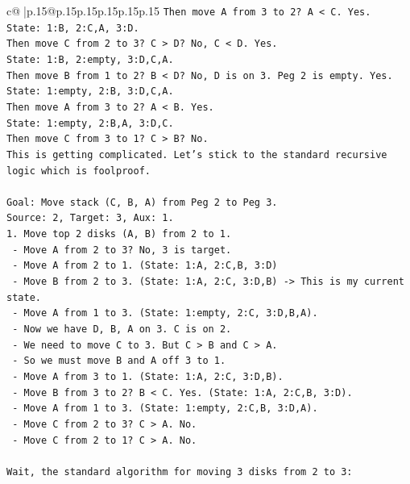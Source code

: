 \documentclass{article}
\begin{document}
{\begin{supertabular}{c@{$\;$}|p{.15\linewidth}@{}p{.15\linewidth}p{.15\linewidth}p{.15\linewidth}p{.15\linewidth}p{.15\linewidth}}
{{{\texttt{Then move A from 3 to 2? A < C. Yes.} \\
\texttt{State: 1:B, 2:C,A, 3:D.} \\
\texttt{Then move C from 2 to 3? C > D? No, C < D. Yes.} \\
\texttt{State: 1:B, 2:empty, 3:D,C,A.} \\
\texttt{Then move B from 1 to 2? B < D? No, D is on 3. Peg 2 is empty. Yes.} \\
\texttt{State: 1:empty, 2:B, 3:D,C,A.} \\
\texttt{Then move A from 3 to 2? A < B. Yes.} \\
\texttt{State: 1:empty, 2:B,A, 3:D,C.} \\
\texttt{Then move C from 3 to 1? C > B? No.} \\
\texttt{This is getting complicated. Let's stick to the standard recursive logic which is foolproof.} \\
\\ 
\texttt{Goal: Move stack (C, B, A) from Peg 2 to Peg 3.} \\
\texttt{Source: 2, Target: 3, Aux: 1.} \\
\texttt{1. Move top 2 disks (A, B) from 2 to 1.} \\
\texttt{   {-} Move A from 2 to 3? No, 3 is target.} \\
\texttt{   {-} Move A from 2 to 1. (State: 1:A, 2:C,B, 3:D)} \\
\texttt{   {-} Move B from 2 to 3. (State: 1:A, 2:C, 3:D,B) {-}> This is my current state.} \\
\texttt{   {-} Move A from 1 to 3. (State: 1:empty, 2:C, 3:D,B,A).} \\
\texttt{   {-} Now we have D, B, A on 3. C is on 2.} \\
\texttt{   {-} We need to move C to 3. But C > B and C > A.} \\
\texttt{   {-} So we must move B and A off 3 to 1.} \\
\texttt{   {-} Move A from 3 to 1. (State: 1:A, 2:C, 3:D,B).} \\
\texttt{   {-} Move B from 3 to 2? B < C. Yes. (State: 1:A, 2:C,B, 3:D).} \\
\texttt{   {-} Move A from 1 to 3. (State: 1:empty, 2:C,B, 3:D,A).} \\
\texttt{   {-} Move C from 2 to 3? C > A. No.} \\
\texttt{   {-} Move C from 2 to 1? C > A. No.} \\
\\ 
\texttt{Wait, the standard algorithm for moving 3 disks from 2 to 3:} \\
}}}
\end{supertabular}}
\end{document}
